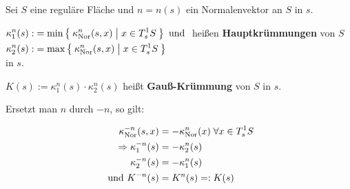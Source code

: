 \begin{definition}%
    Sei $S$ eine reguläre Fläche und $n=n(s)$ ein Normalenvektor an
    $S$ in $s$.

    \begin{defenum}
        \item $\begin{aligned}[t]
                \kappa^n_1(s) :&= \min \Set{\kappa_{\textnormal{Nor}}^n(s,x) | x \in T_s^1 S} \text{ und }\\
                \kappa^n_2(s) :&= \max \Set{\kappa_{\textnormal{Nor}}^n(s,x) | x \in T_s^1 S}
              \end{aligned}$
              heißen \textbf{Hauptkrümmungen} von $S$ in $s$.
        \item $K(s) := \kappa_1^n(s) \cdot \kappa_2^n(s)$ heißt
              \textbf{Gauß-Krümmung} von $S$ in $s$.
    \end{defenum}
\end{definition}

\begin{bemerkung}%
    Ersetzt man $n$ durch $-n$, so gilt:

    \begin{align*}
                \kappa_{\textnormal{Nor}}^{-n}(s, x) &= - \kappa_{\textnormal{Nor}}^n(x)\; \forall x \in T_s^1 S\\
        \Rightarrow \kappa_1^{-n}(s) &= - \kappa_2^n(s)\\
                    \kappa_2^{-n}(s) &= - \kappa_1^n (s)\\
              \text{ und } K^{-n}(s) &= K^n(s) =: K(s)
    \end{align*}
\end{bemerkung}


